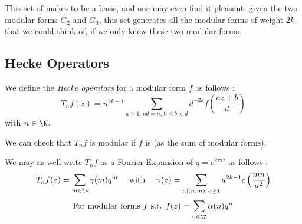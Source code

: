 This set of makes to be a basis, and one may even find it pleasant: given the two modular forms $G_2$ and $G_3$, this set generates all the modular forms of weight $2k$ that we could think of, if we only knew these two modular forms.



\subsection{Hecke Operators}
\label{DefHeckeOperators}
We define the \textit{Hecke operators} for a modular form $f$ as follows \cite[p.100]{CourseInArithmetic}:
$$
T_nf(z) = n^{2k-1}\sum_{a \geq 1,\, ad=n,\, 0 \leq b < d} d^{-2k}f \left( \frac{az+b}{d} \right)
$$
with $n \in \N$.

We can check that $T_nf$ is modular if $f$ is (as the sum of modular forms).


We may as well write $T_nf$ as a Fourier Expansion of $q=e^{2 \pi i z}$ as follows \cite[p.100]{CourseInArithmetic}:
$$
T_nf(z) = \sum_{m \in \Z} \gamma(m)q^m
\quad \text{ with } \quad 
\gamma(z) = \sum_{a | (n,m),\, a \geq 1} a^{2k-1} c\left( \frac{mn}{a^2} \right)
$$
$$
\text{For modular forms } f \text{ s.t. }
f(z) = \sum_{n \in \Z} \alpha(n)q^n
$$




